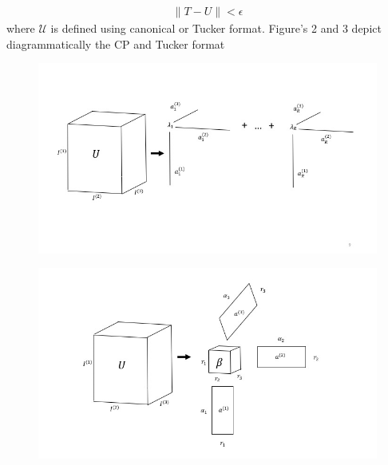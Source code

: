	  	\begin{equation}
	  		\begin{aligned}
	  			\|\mathit{T} - \mathit{U}\| < \epsilon
	  		\end{aligned}
	  	\end{equation}
	  where $\mathcal{U}$ is defined using canonical or Tucker format. Figure's 2 and 3 depict diagrammatically the CP and Tucker format\\
	  \begin{figure}
		\centering
			\begin{minipage}{.5\textwidth}
			  \centering
			  \includegraphics[width=1\linewidth]{./pics/CP_picture.jpg}
			  \label{fig:Figure 2}
			\end{minipage}%
			\begin{minipage}{.5\textwidth}
			  \centering
			  \includegraphics[width=1 \linewidth]{./pics/Tucker_picture.jpg}
			  \label{fig:Figure 3}
			\end{minipage}
		\end{figure}

